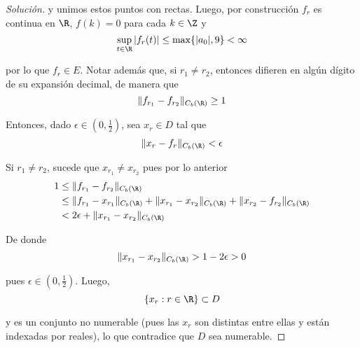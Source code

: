 \documentclass[duedate = 11 de Septiembre, 
			ramo = An\'alisis Funcional, 
			doctype = Tarea 1,
			semester = 2,
			year = 2017]{tarea}
\begin{document}
\begin{enumerate}[(i)]
\begin{proof}[Solución]
	y unimos estos puntos con rectas. Luego, por construcción $f_{r}$ es continua en $\R$, $f(k) = 0$ para cada $k \in \Z$ y
		$$\sup_{t \in \R} |f_{r}(t)| \leq \max\{|a_{0}|,9\} < \infty$$
	
	por lo que $f_{r} \in E$. Notar además que, si $r_{1} \neq r_{2}$, entonces difieren en algún dígito de su expansión decimal, de manera que
		$$\|f_{r_{1}} - f_{r_{2}}\|_{C_{b}(\R)} \geq 1$$
	
	Entonces, dado $\epsilon \in \left(0,\frac{1}{2}\right)$, sea $x_{r} \in D$ tal que
		$$\|x_{r} - f_{r}\|_{C_{b}(\R)} < \epsilon $$
		
	Si $r_{1} \neq r_{2}$, sucede que $x_{r_{1}} \neq x_{r_{2}}$ pues por lo anterior
		\begin{align*}
			1	&\leq		\|f_{r_{1}} - f_{r_{2}}\|_{C_{b}(\R)}	\\
				&\leq		\|f_{r_{1}} - x_{r_{1}}\|_{C_{b}(\R)} + \|x_{r_{1}} - x_{r_{2}}\|_{C_{b}(\R)} + \|x_{r_{2}} - f_{r_{2}}\|_{C_{b}(\R)}	\\
				&<		2\epsilon + \|x_{r_{1}} - x_{r_{2}}\|_{C_{b}(\R)}
		\end{align*}
	
	De donde
		$$\|x_{r_{1}} - x_{r_{2}}\|_{C_{b}(\R)} > 1- 2\epsilon > 0$$
		
	pues $\epsilon \in \left(0,\frac{1}{2}\right)$. Luego,
		$$\{x_{r}: r \in \R\} \subset D$$
	
	y es un conjunto no numerable (pues las $x_{r}$ son distintas entre ellas y están indexadas por reales), lo que contradice que $D$ sea numerable.
	\end{proof}
\end{enumerate}
\end{document}
